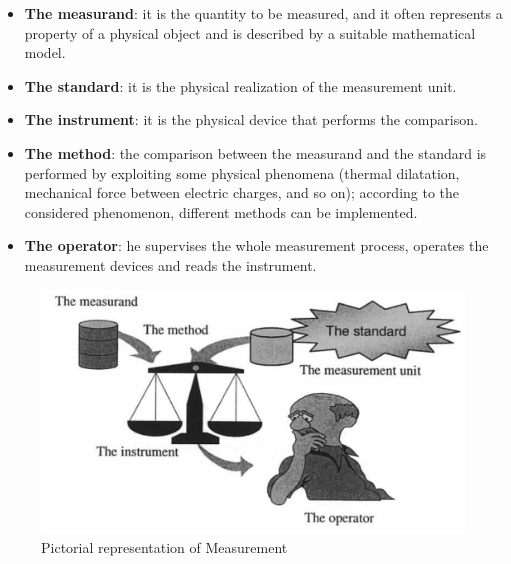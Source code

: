 \begin{itemize}
\item \textbf{The measurand}: it is the quantity to be measured, and it often represents a property of a
physical object and is described by a suitable mathematical model.
\item \textbf{The standard}: it is the physical realization of the measurement unit.
\item \textbf{The instrument}: it is the physical device that performs the comparison.
\item \textbf{The method}: the comparison between the measurand and the standard is performed by
exploiting some physical phenomena (thermal dilatation, mechanical force between
electric charges, and so on); according to the considered phenomenon, different methods
can be implemented.
\item \textbf{The operator}: he supervises the whole measurement process, operates the measurement
devices and reads the instrument.
\end{itemize}

\begin{figure}
\centering
\caption{Pictorial representation of Measurement}
\label{fig:pictorial_representation_of_measurement}
\includegraphics[scale=.5]{./img/measurement.png}
\end{figure}

